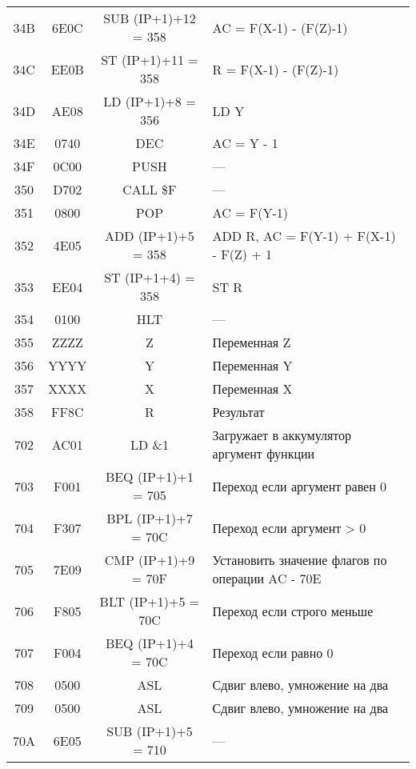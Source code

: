 \begin{table}[h!]
\begin{longtable}{| c | c | c | p{9.5cm} |}
        34B   & 6E0C        & SUB (IP+1)+12 = 358 & AC = F(X-1) - (F(Z)-1)                                                   \\
        34C & EE0B & ST (IP+1)+11 = 358 & R = F(X-1) - (F(Z)-1) \\
        34D & AE08 & LD (IP+1)+8 = 356 & LD Y \\
        34E & 0740 & DEC & AC = Y - 1 \\
        34F & 0C00 & PUSH & --- \\
        350 & D702 & CALL \$F & --- \\
        351 & 0800 & POP & AC = F(Y-1) \\
        352 & 4E05 & ADD (IP+1)+5 = 358 & ADD R, AC = F(Y-1) + F(X-1) - F(Z) + 1 \\
        353 & EE04 & ST (IP+1+4) = 358 & ST R \\
        354 & 0100 & HLT & --- \\
        355 & ZZZZ & Z & Переменная Z \\
        356 & YYYY & Y & Переменная Y \\
        357 & XXXX & X & Переменная X \\
        358 & FF8C & R & Результат \\
        \hline
        \hline
        702   & AC01        & LD \&1              & Загружает в аккумулятор аргумент функции              \\
        703   & F001        & BEQ (IP+1)+1 = 705  & Переход если аргумент равен 0                         \\
        704   & F307        & BPL (IP+1)+7 = 70C  & Переход если аргумент > 0                             \\
        705   & 7E09        & CMP (IP+1)+9 = 70F  & Установить значение флагов по операции AC - 70E       \\
        706   & F805        & BLT (IP+1)+5 = 70C  & Переход если строго меньше                            \\
        707   & F004        & BEQ (IP+1)+4 = 70C  & Переход если равно 0                                  \\
        708   & 0500        & ASL                 & Сдвиг влево, умножение на два                                                   \\
        709   & 0500        & ASL                 & Сдвиг влево, умножение на два                                                   \\
        70A   & 6E05        & SUB (IP+1)+5 = 710  & ---                                                   \\

\end{longtable}
\end{table}
